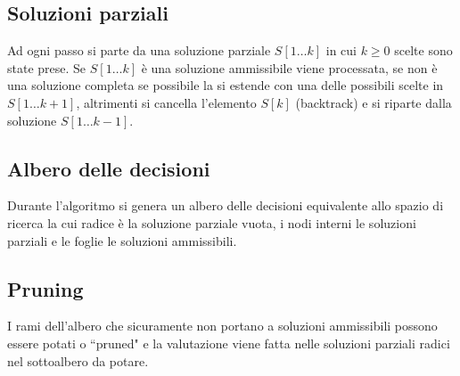 \subsection{Soluzioni parziali}
Ad ogni passo si parte da una soluzione parziale $S[1\dots k]$ in cui $k\ge 0$ scelte sono state prese. Se $S[1\dots k]$ \`e una soluzione ammissibile viene processata, se non \`e 
una soluzione completa se possibile la si estende con una delle possibili scelte in $S[1\dots k+1]$, altrimenti si cancella l'elemento $S[k]$ (backtrack) e si riparte dalla soluzione
$S[1\dots k-1]$.
\subsection{Albero delle decisioni}
Durante l'algoritmo si genera un albero delle decisioni equivalente allo spazio di ricerca la cui radice \`e la soluzione parziale vuota, i nodi interni le soluzioni parziali e le
foglie le soluzioni ammissibili.
\subsection{Pruning}
I rami dell'albero che sicuramente non portano a soluzioni ammissibili possono essere potati o ``pruned" e la valutazione viene fatta nelle soluzioni parziali radici nel sottoalbero da
potare.

